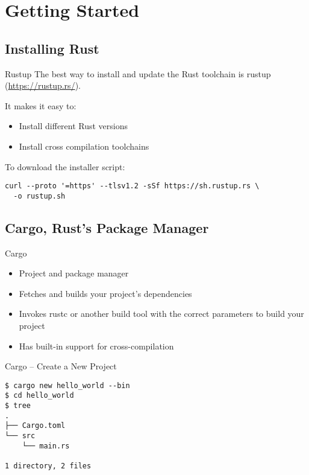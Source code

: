 \section{Getting Started}

\subsection{Installing Rust}

\begin{frame}[fragile]{Rustup}
	The best way to install and update the Rust toolchain is rustup
	(\url{https://rustup.rs/}).

	It makes it easy to:

	\begin{itemize}
		\item Install different Rust versions
		\item Install cross compilation toolchains
	\end{itemize}

	\vspace{1em}

	To download the installer script:

\begin{verbatim}
curl --proto '=https' --tlsv1.2 -sSf https://sh.rustup.rs \
  -o rustup.sh
\end{verbatim}
\end{frame}

\subsection{Cargo, Rust's Package Manager}
\begin{frame}[c]{Cargo}
    \begin{itemize}
        \item Project and package manager
        \item Fetches and builds your project’s dependencies
        \item Invokes rustc or another build tool with the correct parameters
            to build your project
        \item Has built-in support for cross-compilation
    \end{itemize}
\end{frame}
\begin{frame}[fragile]{Cargo -- Create a New Project}
\begin{verbatim}
$ cargo new hello_world --bin
$ cd hello_world
$ tree
.
├── Cargo.toml
└── src
    └── main.rs

1 directory, 2 files
\end{verbatim}
\end{frame}


